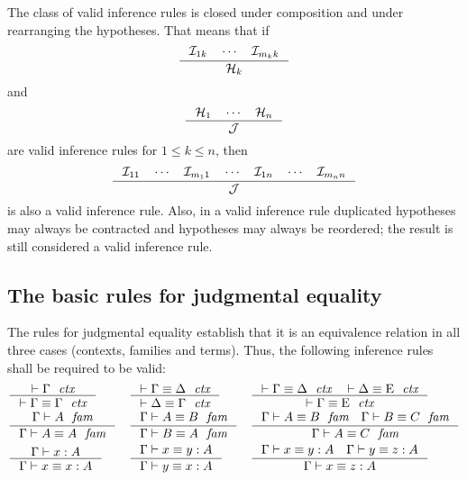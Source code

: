 The class of valid inference rules is closed under composition and under
rearranging the hypotheses. That
means that if
\begin{equation*}
\inference{\mathcal{I}_{1k}\quad\cdots\quad\mathcal{I}_{m_kk}}{\mathcal{H}_k}
\end{equation*}
and
\begin{equation*}
\inference{\mathcal{H}_1\quad\cdots\quad\mathcal{H}_n}{\mathcal{J}}
\end{equation*}
are valid inference rules for $1\leq k\leq n$, then
\begin{equation*}
\inference{\mathcal{I}_{11}\quad\cdots\quad\mathcal{I}_{m_11}\quad\cdots\quad\mathcal{I}_{1n}\quad\cdots\quad\mathcal{I}_{m_nn}}{\mathcal{J}}
\end{equation*}
is also a valid inference rule. Also, in a valid inference rule 
duplicated hypotheses may always be contracted and hypotheses may always be 
reordered; the result is still considered a valid inference rule.

\subsection{The basic rules for judgmental equality}
The rules for judgmental equality establish that it is an equivalence relation
in all three cases (contexts, families and terms). Thus, the following inference
rules shall be required to be valid:
\bgroup\small
\begin{align*}
& \inference
  { \jctx{\Gamma}
    }
  { \jctxeq{\Gamma}{\Gamma}
    } 
& & \inference
    { \jctxeq{\Gamma}{\Delta}
      }
    { \jctxeq{\Delta}{\Gamma}
      } 
& & \inference
    { \jctxeq{\Gamma}{\Delta}
      \jctxeq{\Delta}{\greek{E}}
      }
    { \jctxeq{\Gamma}{\greek{E}}
      }
    \\
& \inference
  { \jfam{\Gamma}{A}
    }
  { \jfameq{\Gamma}{A}{A}
    } 
& & \inference
    { \jfameq{\Gamma}{A}{B}
      }
    { \jfameq{\Gamma}{B}{A}
      }
& & \inference
    { \jfameq{\Gamma}{A}{B}
      \jfameq{\Gamma}{B}{C}
      }
    { \jfameq{\Gamma}{A}{C}
      }
    \\
& \inference
  { \jterm{\Gamma}{A}{x}
    }
  { \jtermeq{\Gamma}{A}{x}{x}
    }
& & \inference
    { \jtermeq{\Gamma}{A}{x}{y}
      }
    { \jtermeq{\Gamma}{A}{y}{x}
      }
& & \inference
    { \jtermeq{\Gamma}{A}{x}{y}
      \jtermeq{\Gamma}{A}{y}{z}
      }
    { \jtermeq{\Gamma}{A}{x}{z}
      }
\end{align*}
\egroup

